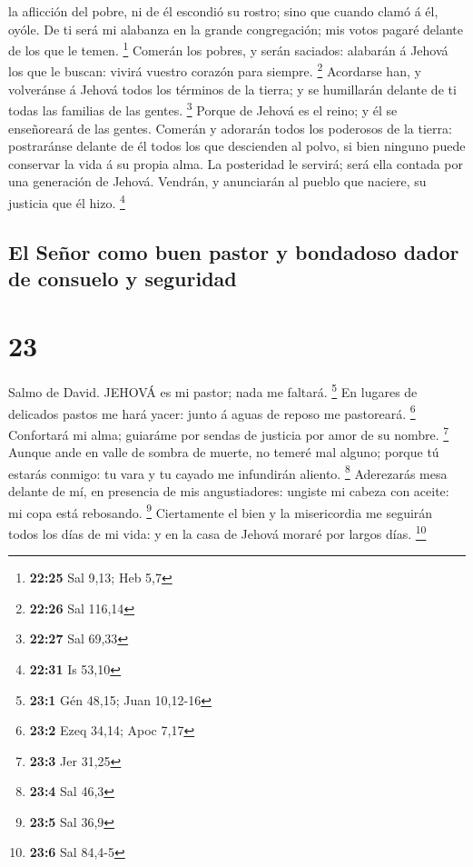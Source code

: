 la aflicción del pobre, ni de él escondió su rostro; sino que cuando
clamó á él, oyóle.  De ti será mi alabanza en la grande
congregación; mis votos pagaré delante de los que le temen. \footnote{\textbf{22:25}
  Sal 9,13; Heb 5,7}  Comerán los pobres, y serán saciados:
alabarán á Jehová los que le buscan: vivirá vuestro corazón para
siempre. \footnote{\textbf{22:26} Sal 116,14}  Acordarse
han, y volveránse á Jehová todos los términos de la tierra; y se
humillarán delante de ti todas las familias de las gentes. \footnote{\textbf{22:27}
  Sal 69,33}  Porque de Jehová es el reino; y él se
enseñoreará de las gentes.  Comerán y adorarán todos los
poderosos de la tierra: postraránse delante de él todos los que
descienden al polvo, si bien ninguno puede conservar la vida á su propia
alma.  La posteridad le servirá; será ella contada por una
generación de Jehová.  Vendrán, y anunciarán al pueblo que
naciere, su justicia que él hizo. \footnote{\textbf{22:31} Is 53,10}

\hypertarget{el-seuxf1or-como-buen-pastor-y-bondadoso-dador-de-consuelo-y-seguridad}{%
\subsection{El Señor como buen pastor y bondadoso dador de consuelo y
seguridad}\label{el-seuxf1or-como-buen-pastor-y-bondadoso-dador-de-consuelo-y-seguridad}}

\hypertarget{section-22}{%
\section{23}\label{section-22}}

 Salmo de David. JEHOVÁ es mi pastor; nada me faltará.
\footnote{\textbf{23:1} Gén 48,15; Juan 10,12-16}  En
lugares de delicados pastos me hará yacer: junto á aguas de reposo me
pastoreará. \footnote{\textbf{23:2} Ezeq 34,14; Apoc 7,17} 
Confortará mi alma; guiaráme por sendas de justicia por amor de su
nombre. \footnote{\textbf{23:3} Jer 31,25}  Aunque ande en
valle de sombra de muerte, no temeré mal alguno; porque tú estarás
conmigo: tu vara y tu cayado me infundirán aliento. \footnote{\textbf{23:4}
  Sal 46,3}  Aderezarás mesa delante de mí, en presencia de
mis angustiadores: ungiste mi cabeza con aceite: mi copa está rebosando.
\footnote{\textbf{23:5} Sal 36,9}  Ciertamente el bien y la
misericordia me seguirán todos los días de mi vida: y en la casa de
Jehová moraré por largos días. \footnote{\textbf{23:6} Sal 84,4-5}

